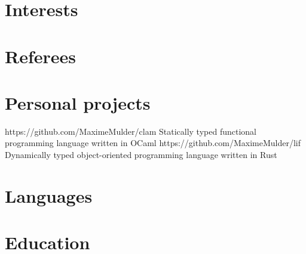 \documentclass[letterpaper]{template}
\begin{document}
\makeprofile

\section{Interests}

\begin{interests}
\end{interests}

\section{Referees}

\begin{referees}
\end{referees}

\section{Personal projects}

\begin{projects}
  	{https://github.com/MaximeMulder/clam}
  	{Statically typed functional programming language written in OCaml}
  	{https://github.com/MaximeMulder/lif}
  	{Dynamically typed object-oriented programming language written in Rust}
\end{projects}

\section{Languages}

\begin{naturallanguages}
\end{naturallanguages}

\switch

\section{Education}
\end{document}
